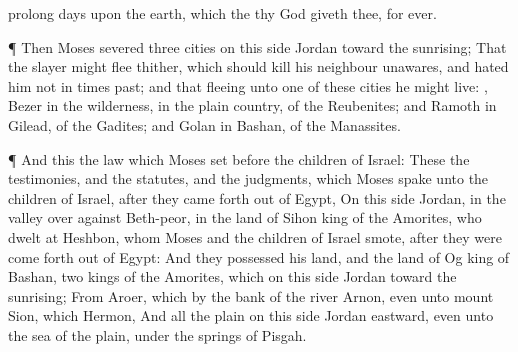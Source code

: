 {prolong
{}
days upon the
earth, which the
{} thy
God
giveth thee, for ever.
\par }{\PP {}¶ Then
Moses
severed
three
cities on this
side
Jordan toward the
sunrising;
That the
slayer might
flee thither, which should
kill his
neighbour
unawares, and
hated him not in
times
past; and that
fleeing unto
one of
these
cities he might
live:
,
Bezer in the
wilderness, in the
plain
country, of the
Reubenites; and
Ramoth in
Gilead, of the
Gadites; and
Golan in
Bashan, of the
Manassites.
\par }{\PP {}¶ And this
{} the
law which
Moses
set
before the
children of
Israel:
These
{} the
testimonies, and the
statutes, and the
judgments, which
Moses
spake unto the
children of
Israel, after they came
forth out of
Egypt,
On this
side
Jordan, in the
valley over
against
Beth-peor, in the
land of
Sihon
king of the
Amorites, who
dwelt at
Heshbon, whom
Moses and the
children of
Israel
smote, after they were come
forth out of
Egypt:
And they
possessed his
land, and the
land of
Og
king of
Bashan,
two
kings of the
Amorites, which
{} on this
side
Jordan toward the
sunrising;
From
Aroer, which
{} by the
bank of the
river
Arnon, even unto
mount
Sion, which
{}
Hermon,
And all the
plain on this
side
Jordan
eastward, even unto the
sea of the
plain, under the
springs of
Pisgah.

}
